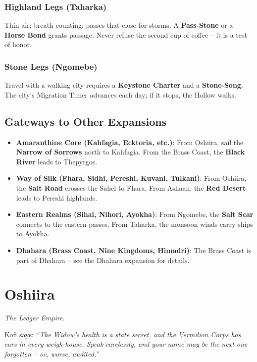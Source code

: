 \documentclass[12pt,oneside]{book}
\begin{document}
\subsection*{Highland Legs (Taharka)}
Thin air; breath-counting; passes that close for storms. A \textbf{Pass-Stone} or a \textbf{Horse Bond} grants passage. Never refuse the second cup of coffee -- it is a test of honor.

\subsection*{Stone Legs (Ngomebe)}
Travel with a walking city requires a \textbf{Keystone Charter} and a \textbf{Stone-Song}. The city's Migration Timer advances each day; if it stops, the Hollow walks.

\section*{Gateways to Other Expansions}

\begin{itemize}
  \item \textbf{Amaranthine Core (Kahfagia, Ecktoria, etc.)}: From Oshiira, sail the \textbf{Narrow of Sorrows} north to Kahfagia. From the Brass Coast, the \textbf{Black River} leads to Thepyrgos.
  \item \textbf{Way of Silk (Fhara, Sidhi, Pereshi, Kuvani, Tulkani)}: From Oshiira, the \textbf{Salt Road} crosses the Sahel to Fhara. From Ashaan, the \textbf{Red Desert} leads to Pereshi highlands.
  \item \textbf{Eastern Realms (Sihai, Nihori, Ayokha)}: From Ngomebe, the \textbf{Salt Scar} connects to the eastern passes. From Taharka, the monsoon winds carry ships to Ayokha.
  \item \textbf{Dhahara (Brass Coast, Nine Kingdoms, Himadri)}: The Brass Coast is part of Dhahara -- see the Dhahara expansion for details.
\end{itemize}
\newpage
\chapter{Oshiira}
\emph{The Ledger Empire.}

\noindent
Kofi says: \textit{``The Widow's health is a state secret, and the Vermilion Corps has ears in every weigh-house. Speak carelessly, and your name may be the next one forgotten -- or, worse, audited.''}
\end{document}
